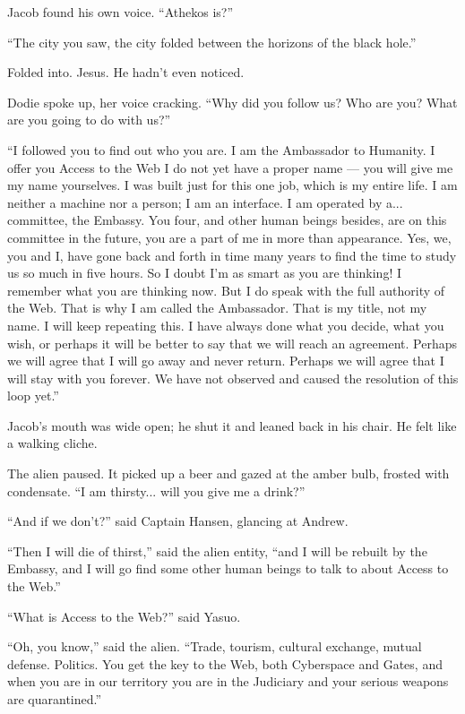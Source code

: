 \documentclass[english,11pt,letterpaper,onecolumn]{scrbook}
\begin{document}
	Jacob found his own voice.  ``Athekos is?''

	``The city you saw, the city folded between the horizons of the black hole.''

	Folded into.  Jesus.  He hadn't even noticed.

	Dodie spoke up, her voice cracking.  ``Why did you follow us?  Who are you?  What are you going to do with us?''

	``I followed you to find out who you are.  I am the Ambassador to Humanity.  I offer you Access to the Web  I do not yet have a proper name --- you will give me my name yourselves.  I was built just for this one job, which is my entire life.  I am neither a machine nor a person; I am an interface.  I am operated by a... committee, the Embassy.  You four, and other human beings besides, are on this committee in the future, you are a part of me in more than appearance.  Yes, we, you and I, have gone back and forth in time many years to find the time to study us so much in five hours.  So I doubt I'm as smart as you are thinking!  I remember what you are thinking now.  But I do speak with the full authority of the Web.  That is why I am called the Ambassador.  That is my title, not my name.  I will keep repeating this.  I have always done what you decide, what you wish, or perhaps it will be better to say that we will reach an agreement.  Perhaps we will agree that I will go away and never return.  Perhaps we will agree that I will stay with you forever.  We have not observed and caused the resolution of this loop yet.''

	Jacob's mouth was wide open; he shut it and leaned back in his chair.  He felt like a walking cliche.

	The alien paused.  It picked up a beer and gazed at the amber bulb, frosted with condensate.  ``I am thirsty... will you give me a drink?''

	``And if we don't?'' said Captain Hansen, glancing at Andrew.

	``Then I will die of thirst,'' said the alien entity, ``and I will be rebuilt by the Embassy, and I will go find some other human beings to talk to about Access to the Web.''

	``What is Access to the Web?'' said Yasuo.

	``Oh, you know,'' said the alien.  ``Trade, tourism, cultural exchange, mutual defense.  Politics.  You get the key to the Web, both Cyberspace and Gates, and when you are in our territory you are in the Judiciary and your serious weapons are quarantined.''
\end{document}
